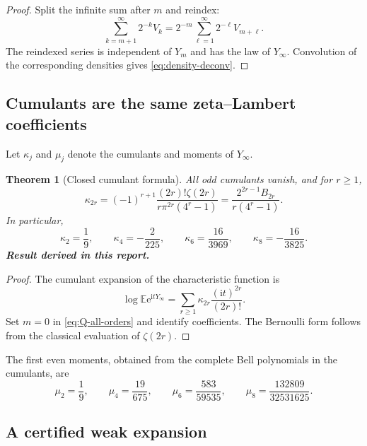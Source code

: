 \documentclass[11pt,oneside]{article}
\numberwithin{equation}{section}
\newtheorem{theorem}{Theorem}[section]
\theoremstyle{definition}
\theoremstyle{remark}
\newcommand{\E}{\mathbb E}
\newcommand{\e}{\mathrm e}
\newcommand{\ii}{\mathrm i}
\newcommand{\newresult}{\textbf{Result derived in this report.}}
\begin{document}
\begin{proof}
Split the infinite sum after $m$ and reindex:
\[
 \sum_{k=m+1}^{\infty}2^{-k}V_k
 =2^{-m}\sum_{\ell=1}^{\infty}2^{-\ell}V_{m+\ell}.
\]
The reindexed series is independent of $Y_m$ and has the law of $Y_\infty$.  Convolution of
the corresponding densities gives \eqref{eq:density-deconv}.
\end{proof}

\subsection{Cumulants are the same zeta--Lambert coefficients}

Let $\kappa_j$ and $\mu_j$ denote the cumulants and moments of $Y_\infty$.

\begin{theorem}[Closed cumulant formula]
\label{thm:cumulants}
All odd cumulants vanish, and for $r\ge1$,
\begin{equation}
 \boxed{
 \kappa_{2r}
 =(-1)^{r+1}\frac{(2r)!\zeta(2r)}{r\pi^{2r}(4^r-1)}
 =\frac{2^{2r-1}B_{2r}}{r(4^r-1)}.}
 \label{eq:cumulants}
\end{equation}
In particular,
\begin{equation}
 \kappa_2=\frac19,\qquad
 \kappa_4=-\frac2{225},\qquad
 \kappa_6=\frac{16}{3969},\qquad
 \kappa_8=-\frac{16}{3825}.
 \label{eq:cumulants-first}
\end{equation}
\newresult
\end{theorem}

\begin{proof}
The cumulant expansion of the characteristic function is
\[
 \log\E\e^{\ii tY_\infty}
 =\sum_{r\ge1}\kappa_{2r}\frac{(\ii t)^{2r}}{(2r)!}.
\]
Set $m=0$ in \eqref{eq:Q-all-orders} and identify coefficients.  The Bernoulli form follows
from the classical evaluation of $\zeta(2r)$.
\end{proof}

The first even moments, obtained from the complete Bell polynomials in the cumulants, are
\begin{equation}
 \mu_2=\frac19,\qquad
 \mu_4=\frac{19}{675},\qquad
 \mu_6=\frac{583}{59535},\qquad
 \mu_8=\frac{132809}{32531625}.
 \label{eq:moments-first}
\end{equation}

\subsection{A certified weak expansion}
\end{document}
